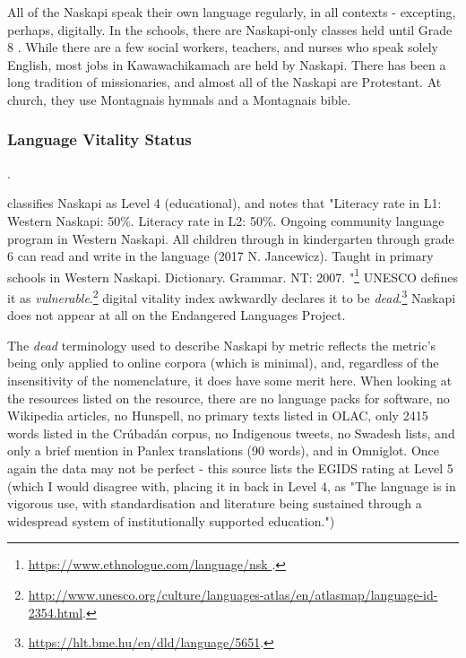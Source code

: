 All of the Naskapi speak their own language regularly, in all contexts - excepting, perhaps, digitally. In the schools, there are Naskapi-only classes held until Grade 8 \cite{llewellyn2017oral}. While there are a few social workers, teachers, and nurses who speak solely English, most jobs in Kawawachikamach are held by Naskapi. There has been a long tradition of missionaries, and almost all of the Naskapi are Protestant. At church, they use Montagnais hymnals and a Montagnais bible.



\subsubsection{Language Vitality Status}
\label{sec:naskapi-vitality-status}.

\citet{lewis2009ethnologue} classifies Naskapi as Level 4 (educational), and notes that "Literacy rate in L1: Western Naskapi: 50\%. Literacy rate in L2: 50\%. Ongoing community language program in Western Naskapi. All children through in kindergarten through grade 6 can read and write in the language (2017 N. Jancewicz). Taught in primary schools in Western Naskapi. Dictionary. Grammar. NT: 2007. "\footnote{\href{https://www.ethnologue.com/language/nsk }{https://www.ethnologue.com/language/nsk }. } UNESCO defines it as {\it vulnerable}.\footnote{\href{http://www.unesco.org/culture/languages-atlas/en/atlasmap/language-id-2354.html}{http://www.unesco.org/culture/languages-atlas/en/atlasmap/language-id-2354.html}. }  digital vitality index awkwardly declares it to be {\it dead}.\footnote{\href{https://hlt.bme.hu/en/dld/language/5651}{https://hlt.bme.hu/en/dld/language/5651}. } Naskapi does not appear at all on the Endangered Languages Project.

The {\it dead} terminology used to describe Naskapi by  metric reflects the metric's being only applied to online corpora (which is minimal), and, regardless of the insensitivity of the nomenclature, it does have some merit here. When looking at the resources listed on the resource, there are no language packs for software, no Wikipedia articles, no Hunspell, no primary texts listed in OLAC, only 2415 words listed in the Cr\'ubad\'an corpus, no Indigenous tweets, no Swadesh lists, and only a brief mention in Panlex translations (90 words), and in Omniglot. Once again the data may not be perfect - this source lists the EGIDS rating at Level 5 (which I would disagree with, placing it in back in Level 4, as "The language is in vigorous use, with standardisation and literature being sustained through a widespread system of institutionally supported education.")

